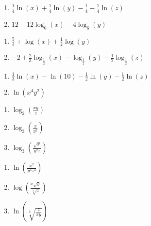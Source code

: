 \begin{multicols}{2}
\begin{enumerate}
\setcounter{enumi}{\value{HW}}

\item $\frac{1}{4} \ln(x) + \frac{1}{4} \ln(y) - \frac{1}{4} - \frac{1}{4} \ln(z)$
\item $12-12\log_{6}(x) - 4\log_{6}(y)$

\setcounter{HW}{\value{enumi}}
\end{enumerate}
\end{multicols}

\begin{multicols}{2}
\begin{enumerate}
\setcounter{enumi}{\value{HW}}

\item $\frac{5}{3}+\log(x)+\frac{1}{2}\log(y)$
\item $-2+\frac{2}{3}\log_{\frac{1}{2}}(x)-\log_{\frac{1}{2}}(y)-\frac{1}{2}\log_{\frac{1}{2}}(z)$

\setcounter{HW}{\value{enumi}}
\end{enumerate}
\end{multicols}

\begin{multicols}{2}
\begin{enumerate}
\setcounter{enumi}{\value{HW}}

\item $\frac{1}{3} \ln(x) - \ln(10) - \frac{1}{2}\ln(y)-\frac{1}{2}\ln(z)$
\item $\ln(x^{4}y^{2})$
\setcounter{HW}{\value{enumi}}
\end{enumerate}
\end{multicols}

\begin{multicols}{3}
\begin{enumerate}
\setcounter{enumi}{\value{HW}}

\item $\log_{2}\left(\frac{xy}{z}\right)$
\item $\log_{3} \left( \frac{x}{y^2} \right)$
\item $\log_{3}\left(\frac{\sqrt{x}}{y^{2}z}\right)$

\setcounter{HW}{\value{enumi}}
\end{enumerate}
\end{multicols}

\begin{multicols}{3}
\begin{enumerate}
\setcounter{enumi}{\value{HW}}


\item $\ln\left( \frac{x^2}{y^3z^4} \right)$
\item $\log\left(\frac{x \sqrt{y}}{\sqrt[3]{z}}  \right)$
\item $\ln\left(\sqrt[3]{\frac{z}{xy}}   \right)$

\setcounter{HW}{\value{enumi}}
\end{enumerate}
\end{multicols}

